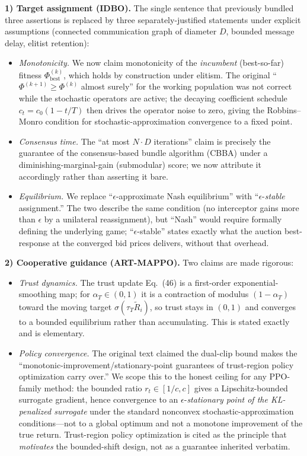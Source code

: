 \documentclass[11pt]{article}
\begin{document}
\medskip\noindent\textbf{1) Target assignment (IDBO).} The single sentence that previously
bundled three assertions is replaced by three separately-justified statements under
explicit assumptions (connected communication graph of diameter $D$, bounded message delay,
elitist retention):
\begin{itemize}
  \item \emph{Monotonicity.} We now claim monotonicity of the \emph{incumbent}
  (best-so-far) fitness $\Phi_{\mathrm{best}}^{(k)}$, which holds by construction under
  elitism. The original ``$\Phi^{(k+1)}\!\ge\!\Phi^{(k)}$ almost surely'' for the working
  population was not correct while the stochastic operators are active; the decaying
  coefficient schedule $c_t=c_0(1-t/T)$ then drives the operator noise to zero, giving the
  Robbins--Monro condition for stochastic-approximation convergence to a fixed point.
  \item \emph{Consensus time.} The ``at most $N\!\cdot\!D$ iterations'' claim is precisely
  the guarantee of the consensus-based bundle algorithm (CBBA) under a diminishing-marginal-gain
  (submodular) score; we now attribute it accordingly rather than asserting it bare.
  \item \emph{Equilibrium.} We replace ``$\epsilon$-approximate Nash equilibrium'' with
  ``$\epsilon$-\emph{stable} assignment.'' The two describe the same condition (no
  interceptor gains more than $\epsilon$ by a unilateral reassignment), but ``Nash'' would
  require formally defining the underlying game; ``$\epsilon$-stable'' states exactly what
  the auction best-response at the converged bid prices delivers, without that overhead.
\end{itemize}

\medskip\noindent\textbf{2) Cooperative guidance (ART-MAPPO).} Two claims are made rigorous:
\begin{itemize}
  \item \emph{Trust dynamics.} The trust update Eq.~(46) is a first-order exponential-smoothing
  map; for $\alpha_T\in(0,1)$ it is a contraction of modulus $(1-\alpha_T)$ toward the moving
  target $\sigma(\tau_T\tilde R_i)$, so trust stays in $(0,1)$ and converges to a bounded
  equilibrium rather than accumulating. This is stated exactly and is elementary.
  \item \emph{Policy convergence.} The original text claimed the dual-clip bound makes the
  ``monotonic-improvement/stationary-point guarantees of trust-region policy optimization
  carry over.'' We scope this to the honest ceiling for any PPO-family method: the bounded
  ratio $r_t\in[1/c,c]$ gives a Lipschitz-bounded surrogate gradient, hence convergence to
  an $\epsilon$-\emph{stationary point of the KL-penalized surrogate} under the standard
  nonconvex stochastic-approximation conditions---not to a global optimum and not a monotone
  improvement of the true return. Trust-region policy optimization is cited as the principle
  that \emph{motivates} the bounded-shift design, not as a guarantee inherited verbatim.
\end{itemize}
\end{document}
